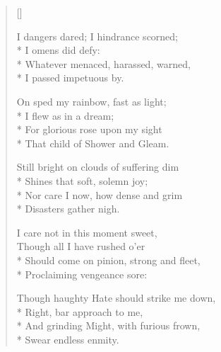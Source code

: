 \begin{verse}[\versewidth]
{		I dangers dared; I hindrance scorned;\\*
		\hspace*{0.333em}\hspace*{0.333em} I omens did defy:\\*
		Whatever menaced, harassed, warned,\\*
		\hspace*{0.333em}\hspace*{0.333em} I passed impetuous by.

		On sped my rainbow, fast as light;\\*
		\hspace*{0.333em}\hspace*{0.333em} I flew as in a dream;\\*
		For glorious rose upon my sight\\*
		\hspace*{0.333em}\hspace*{0.333em} That child of Shower and Gleam.

		Still bright on clouds of suffering dim\\*
		\hspace*{0.333em}\hspace*{0.333em} Shines that soft, solemn joy;\\*
		Nor care I now, how dense and grim\\*
		\hspace*{0.333em}\hspace*{0.333em} Disasters gather nigh.

		I care not in this moment sweet,\\
		\hspace*{0.333em}\hspace*{0.333em} Though all I have rushed o'er\\*
		Should come on pinion, strong and fleet,\\*
		\hspace*{0.333em}\hspace*{0.333em} Proclaiming vengeance sore:

		Though haughty Hate should strike me down,\\*
		\hspace*{0.333em}\hspace*{0.333em} Right, bar approach to me,\\*
		And grinding Might, with furious frown,\\*
		\hspace*{0.333em}\hspace*{0.333em} Swear endless enmity.

}
\end{verse}
